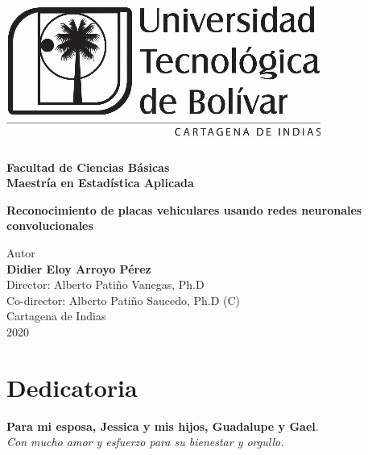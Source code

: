 \begin{center}
\includegraphics[width=0.5 \textwidth]{imagenes/logoUTB_BW.jpg} \\
\vspace{1.0cm}
{\large \textbf{Facultad de Ciencias Básicas} \\
\vspace{0.15cm}
{\large \textbf{Maestría en Estadística Aplicada}}

\vspace{2.5cm}
{\Large\color{AzulClaro} \textbf{Reconocimiento de placas vehiculares usando redes neuronales convolucionales}
}\\
\vspace{1.5cm}

Autor \\
\vspace{0.25cm}
{\large \textbf{Didier Eloy Arroyo Pérez}
}\\
\vspace{2.0cm}
Director: Alberto Patiño Vanegas, Ph.D\\
\vspace{0.25cm}
Co-director: Alberto Patiño Saucedo, Ph.D (C)\\

\vspace{3.0cm}
Cartagena de Indias\\
\vspace{0.25cm}
2020
}
\end{center}
\newpage
\thispagestyle{empty}
\newpage
\thispagestyle{empty}
\chapter*{Dedicatoria}
\setcounter{page}{1}

\begin{center}
    \vspace*{\fill}
   \noindent
	\textbf{Para mi esposa, Jessica y mis hijos, Guadalupe y Gael}.\\
   \textit{Con mucho amor y esfuerzo para su bienestar y orgullo.} 
   \vspace*{\fill}
\end{center}
   
